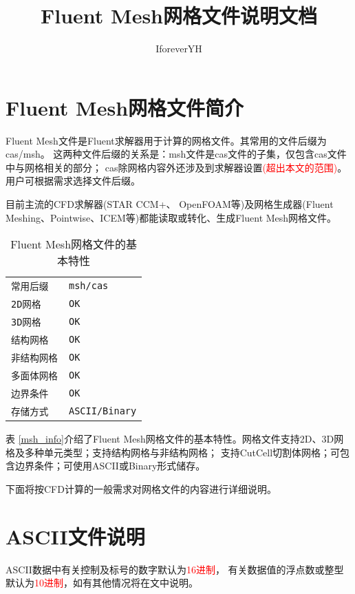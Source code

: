 \documentclass[lang=cn,11pt,a4paper]{elegantpaper} %
\title{Fluent Mesh网格文件说明文档}
\author{IforeverYH}
\date{\zhtoday}
\begin{document}
\maketitle

\section{Fluent Mesh网格文件简介}

Fluent Mesh文件是Fluent求解器用于计算的网格文件。其常用的文件后缀为cas/msh。
这两种文件后缀的关系是：msh文件是cas文件的子集，仅包含cas文件中与网格相关的部分；
cas除网格内容外还涉及到求解器设置\textcolor{red}{(超出本文的范围)}。用户可根据需求选择文件后缀。

目前主流的CFD求解器(STAR CCM+、 OpenFOAM等)及网格生成器(Fluent Meshing、Pointwise、ICEM等)都能读取或转化、生成Fluent Mesh网格文件。

\label{msh_info}
\begin{table}[!htb]
  \centering
  \caption{Fluent Mesh网格文件的基本特性}
  \begin{tabular}{*{2}{l}}
   \hline
   \texttt{常用后缀}         & \texttt{msh/cas} \\
   \texttt{2D网格}           & \texttt{OK} \\
   \texttt{3D网格}           & \texttt{OK} \\
   \texttt{结构网格}         & \texttt{OK} \\
   \texttt{非结构网格}       & \texttt{OK} \\
   \texttt{多面体网格}       & \texttt{OK} \\
   \texttt{边界条件}         & \texttt{OK} \\
   \texttt{存储方式}         & \texttt{ASCII/Binary} \\
   \hline
  \end{tabular}
\end{table}

表 \ref{msh_info}介绍了Fluent Mesh网格文件的基本特性。网格文件支持2D、3D网格及多种单元类型；支持结构网格与非结构网格；
支持CutCell切割体网格；可包含边界条件；可使用ASCII或Binary形式储存。

下面将按CFD计算的一般需求对网格文件的内容进行详细说明。


\section{ASCII文件说明}

ASCII数据中有关控制及标号的数字默认为\textcolor{red}{16进制}，
有关数据值的浮点数或整型默认为\textcolor{red}{10进制}，如有其他情况将在文中说明。
\end{document}
